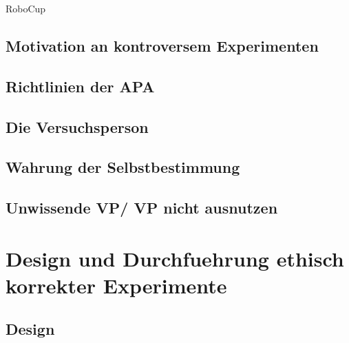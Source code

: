 \documentclass[10pt]{beamer}
\begin{document}
	\begin{frame}{RoboCup}
		
	\end{frame}

	
\subsection{Motivation an kontroversem Experimenten}
\subsection{Richtlinien der APA}
%
\subsection{Die Versuchsperson}
\subsection{Wahrung der Selbstbestimmung}

\subsection{Unwissende VP/ VP nicht ausnutzen}

\section{Design und Durchfuehrung ethisch korrekter Experimente}
\subsection{Design}
\end{document}
